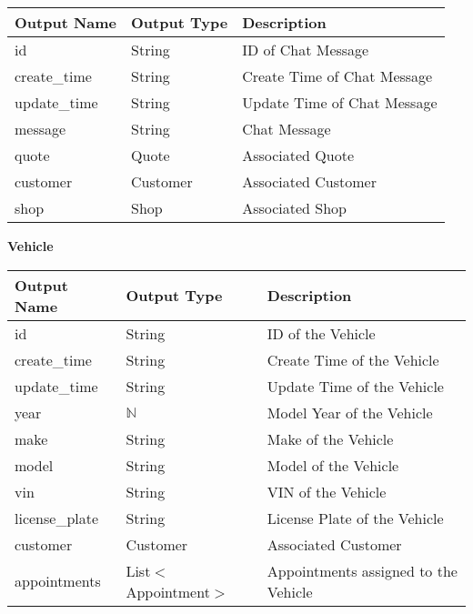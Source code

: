 \documentclass[12pt, titlepage]{article}
\begin{document}
\begin{table}[H]
	\begin{tabular}{|p{}|p{}|p{}|}
		\hline
		\textbf{Output Name} & \textbf{Output Type} & \textbf{Description}        \\
		\hline
		id                   & String               & ID of Chat Message          \\
		\hline
		create\_time         & String               & Create Time of Chat Message \\
		\hline
		update\_time         & String               & Update Time of Chat Message \\
		\hline
		message              & String               & Chat Message                \\
		\hline
		quote                & Quote                & Associated Quote            \\
		\hline
		customer             & Customer             & Associated Customer         \\
		\hline
		shop                 & Shop                 & Associated Shop             \\
		\hline
	\end{tabular}
\end{table}

\textbf{Vehicle}

\begin{table}[H]
	\begin{tabular}{|p{}|p{}|p{}|}
		\hline
		\textbf{Output Name} & \textbf{Output Type}  & \textbf{Description}                 \\
		\hline
		id                   & String                & ID of the Vehicle                    \\
		\hline
		create\_time         & String                & Create Time of the Vehicle           \\
		\hline
		update\_time         & String                & Update Time of the Vehicle           \\
		\hline
		year                 & $\mathbb{N}$          & Model Year of the Vehicle            \\
		\hline
		make                 & String                & Make of the Vehicle                  \\
		\hline
		model                & String                & Model of the Vehicle                 \\
		\hline
		vin                  & String                & VIN of the Vehicle                   \\
		\hline
		license\_plate       & String                & License Plate of the Vehicle         \\
		\hline
		customer             & Customer              & Associated Customer                  \\
		\hline
		appointments         & List$<$Appointment$>$ & Appointments assigned to the Vehicle \\
		\hline
	\end{tabular}
\end{table}
\end{document}

